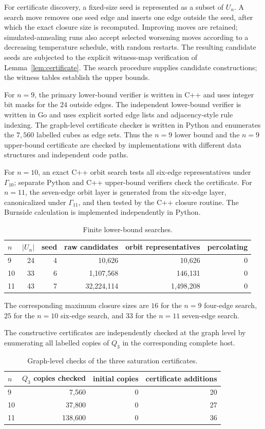 \documentclass[11pt]{article}
\numberwithin{equation}{section}
\begin{document}
For certificate discovery, a fixed-size seed is represented as a subset of $U_n$. A search move removes one seed edge and inserts one edge outside the seed, after which the exact closure size is recomputed. Improving moves are retained; simulated-annealing runs also accept selected worsening moves according to a decreasing temperature schedule, with random restarts. The resulting candidate seeds are subjected to the explicit witness-map verification of Lemma~\ref{lem:certificate}. The search procedure supplies candidate constructions; the witness tables establish the upper bounds.

For $n=9$, the primary lower-bound verifier is written in C++ and uses integer bit masks for the $24$ outside edges. The independent lower-bound verifier is written in Go and uses explicit sorted edge lists and adjacency-style rule indexing. The graph-level certificate checker is written in Python and enumerates the $7,560$ labelled cubes as edge sets. Thus the $n=9$ lower bound and the $n=9$ upper-bound certificate are checked by implementations with different data structures and independent code paths.

For $n=10$, an exact C++ orbit search tests all six-edge representatives under $\Gamma_{10}$; separate Python and C++ upper-bound verifiers check the certificate. For $n=11$, the seven-edge orbit layer is generated from the six-edge layer, canonicalized under $\Gamma_{11}$, and then tested by the C++ closure routine. The Burnside calculation is implemented independently in Python.

\begin{table}[t]
\centering
\caption{Finite lower-bound searches.}
\label{tab:searches}
\begin{tabular}{lrrrrr}
\toprule
$n$ & $|U_n|$ & seed & raw candidates & orbit representatives & percolating \\
\midrule
9  & 24 & 4 & 10,626 & 10,626 & 0 \\
10 & 33 & 6 & 1,107,568 & 146,131 & 0 \\
11 & 43 & 7 & 32,224,114 & 1,498,208 & 0 \\
\bottomrule
\end{tabular}
\end{table}

The corresponding maximum closure sizes are $16$ for the $n=9$ four-edge search, $25$ for the $n=10$ six-edge search, and $33$ for the $n=11$ seven-edge search.

The constructive certificates are independently checked at the graph level by enumerating all labelled copies of $Q_3$ in the corresponding complete host.
\begin{table}[t]
\centering
\caption{Graph-level checks of the three saturation certificates.}
\label{tab:graphcheck}
\begin{tabular}{lrrr}
\toprule
$n$ & $Q_3$ copies checked & initial copies & certificate additions \\
\midrule
9  & 7,560   & 0 & 20 \\
10 & 37,800  & 0 & 27 \\
11 & 138,600 & 0 & 36 \\
\bottomrule
\end{tabular}
\end{table}
\end{document}
